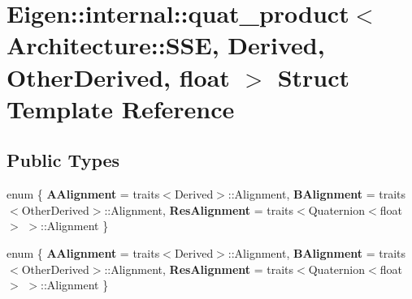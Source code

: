\hypertarget{struct_eigen_1_1internal_1_1quat__product_3_01_architecture_1_1_s_s_e_00_01_derived_00_01_other_derived_00_01float_01_4}{}\section{Eigen\+:\+:internal\+:\+:quat\+\_\+product$<$ Architecture\+:\+:S\+SE, Derived, Other\+Derived, float $>$ Struct Template Reference}
\label{struct_eigen_1_1internal_1_1quat__product_3_01_architecture_1_1_s_s_e_00_01_derived_00_01_other_derived_00_01float_01_4}
\subsection*{Public Types}
\begin{DoxyCompactItemize}
\item 
\mbox{\label{struct_eigen_1_1internal_1_1quat__product_3_01_architecture_1_1_s_s_e_00_01_derived_00_01_other_derived_00_01float_01_4_a01fad0c7016d3f71ab6e46c8c12f3731}} 
enum \{ {\bfseries A\+Alignment} = traits$<$Derived$>$\+:\+:Alignment, 
{\bfseries B\+Alignment} = traits$<$Other\+Derived$>$\+:\+:Alignment, 
{\bfseries Res\+Alignment} = traits$<$Quaternion$<$float$>$ $>$\+:\+:Alignment
 \}
\item 
\mbox{\label{struct_eigen_1_1internal_1_1quat__product_3_01_architecture_1_1_s_s_e_00_01_derived_00_01_other_derived_00_01float_01_4_af4fb7dfa0cbbd8a2dbf98f388c561052}} 
enum \{ {\bfseries A\+Alignment} = traits$<$Derived$>$\+:\+:Alignment, 
{\bfseries B\+Alignment} = traits$<$Other\+Derived$>$\+:\+:Alignment, 
{\bfseries Res\+Alignment} = traits$<$Quaternion$<$float$>$ $>$\+:\+:Alignment
 \}
\end{DoxyCompactItemize}
